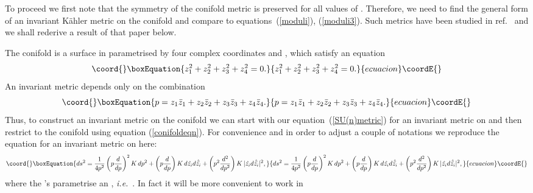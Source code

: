\documentclass[a4paper,12pt]{article}
\providecommand{\labell}[1]{\label{#1}}
\providecommand{\reef}[1]{(\ref{#1})}
\begin{document}
To proceed we first note that the \coordHE{} symmetry of the
conifold metric is preserved for all values of \coordHE{}. Therefore, we need
to find the general form of an \coordHE{} invariant K\"ahler
metric on the conifold and compare to equations~\reef{moduli},
\reef{moduli3}. Such metrics have been studied in ref.~\cite{candelas}
and we shall rederive a result of that paper below.

The conifold is a surface in \coordHE{} parametrised by four
complex coordinates \coordHE{} and \coordHE{}, which satisfy an
equation
\begin{equation}\coord{}\boxEquation{
  z_1 ^2 + z_2 ^2 + z_3 ^2 + z_4 ^2 = 0.
\labell{conifoldeqn}
}{
  z_1 ^2 + z_2 ^2 + z_3 ^2 + z_4 ^2 = 0.
\labell{conifoldeqn}
}{ecuacion}\coordE{}\end{equation}
An \coordHE{} invariant metric depends only on the
combination
\begin{equation}\coord{}\boxEquation{
  p = z_1 \bar{z}_1 + z_2 \bar{z}_2 + z_3 \bar{z}_3 + z_4 \bar{z}_4 .
}{
  p = z_1 \bar{z}_1 + z_2 \bar{z}_2 + z_3 \bar{z}_3 + z_4 \bar{z}_4 .
}{ecuacion}\coordE{}\end{equation}
Thus, to construct an \coordHE{} invariant metric on the
conifold we can start with our equation~\reef{SU(n)metric} for an
\coordHE{} invariant metric on \coordHE{} and then restrict to the
conifold using equation \reef{conifoldeqn}. For convenience and in
order to adjust a couple of notations we reproduce the equation for an
\coordHE{} invariant metric on \coordHE{} here:
\begin{equation}\coord{}\boxEquation{
ds^2 = {1 \over 4p^2} \left(p {d \over dp}\right)^2 K\, dp^2 + \left(p {d \over dp}\right) K\, d\hat{z_i} d\hat{\bar{z_i}} + \left(p^2 {d^2 \over dp^2}\right) K \, | \hat{z_i} d\hat{\bar{z_i}}|^2  ,
}{
ds^2 = {1 \over 4p^2} \left(p {d \over dp}\right)^2 K\, dp^2 + \left(p {d \over dp}\right) K\, d\hat{z_i} d\hat{\bar{z_i}} + \left(p^2 {d^2 \over dp^2}\right) K \, | \hat{z_i} d\hat{\bar{z_i}}|^2  ,
}{ecuacion}\coordE{}\end{equation}
where the \coordHE{}'s parametrise an \coordHE{}, {\it i.e.}~\coordHE{}. In fact it will be more convenient to work in
\end{document}
